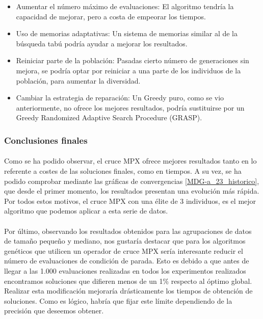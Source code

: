 	\begin{itemize}
		\item Aumentar el número máximo de evaluaciones: El algoritmo tendría la capacidad de mejorar, pero a costa de empeorar los tiempos.
		\item Uso de memorias adaptativas: Un sistema de memorias similar al de la búsqueda tabú podría ayudar a mejorar los resultados.
		\item Reiniciar parte de la población: Pasadas cierto número de generaciones sin mejora, se podría optar por reiniciar a una parte de los individuos de la población, para aumentar la diversidad.
		\item Cambiar la estrategia de reparación: Un Greedy puro, como se vio anteriormente, no ofrece los mejores resultados, podría sustituirse por un Greedy Randomized Adaptive Search Procedure (GRASP).
		
	\end{itemize} 
	
	
	\subsubsection{Conclusiones finales}
	
	\paragraph{} Como se ha podido observar, el cruce MPX ofrece mejores resultados tanto en lo referente a costes de las soluciones finales, como en tiempos. A su vez, se ha podido comprobar mediante las gráficas de convergencias \ref{MDG-a_23_historico}, que desde el primer momento, los resultados presentan una evolución más rápida. Por todos estos motivos, el cruce MPX con una élite de 3 individuos, es el mejor algoritmo que podemos aplicar a esta serie de datos.

	
	\paragraph{}Por último, observando los resultados obtenidos para las agrupaciones de datos de tamaño pequeño y mediano, nos gustaría destacar que para los algoritmos genéticos que utilicen un operador de cruce MPX sería interesante reducir el número de evaluaciones de condición de parada. Esto es debido a que antes de llegar a las 1.000 evaluaciones realizadas en todos los experimentos realizados encontramos soluciones que difieren menos de un 1\% respecto al óptimo global. Realizar esta modificación mejoraría drásticamente los tiempos de obtención de soluciones. Como es lógico, habría que fijar este límite dependiendo de la precisión que deseemos obtener.
	
